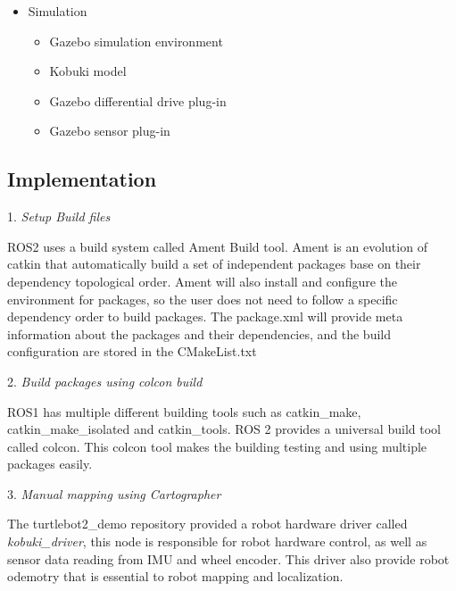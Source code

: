 \documentclass[letterpaper, 10 pt, conference]{ieeeconf}  %
\begin{document}
\begin{itemize}
    \item Simulation 
        \begin{itemize}
            \item Gazebo simulation environment 
            \item Kobuki model 
            \item Gazebo differential drive plug-in  
            \item Gazebo sensor plug-in 
        \end{itemize}{}
\end{itemize}{}

\subsection{Implementation}

1. \textit{Setup Build files} \par \vspace{5pt}
 ROS2 uses a build system called Ament Build tool. Ament is an evolution of catkin that automatically build a set of independent packages base on their dependency topological order. Ament will also install and configure the environment for packages, so the user does not need to follow a specific dependency order to build packages. The package.xml will provide meta information about the packages and their dependencies, and the build configuration are stored in the CMakeList.txt  \par \vspace{5pt}
 
2. \textit{Build packages using colcon build}\par\vspace{5pt}
ROS1 has multiple different building tools such as catkin\_make, catkin\_make\_isolated and catkin\_tools. ROS 2 provides a universal build tool called colcon. This colcon tool makes the building testing and using multiple packages easily\cite{c7}. \par\vspace{5pt}

3. \textit{Manual mapping using Cartographer}\par\vspace{5pt}

The turtlebot2\_demo repository provided a robot hardware driver called \textit{kobuki\_driver}, this node is responsible for robot hardware control, as well as sensor data reading from IMU and wheel encoder. This driver also provide robot odemotry that is essential to robot mapping and localization. \par\vspace{5pt}
\end{document}

